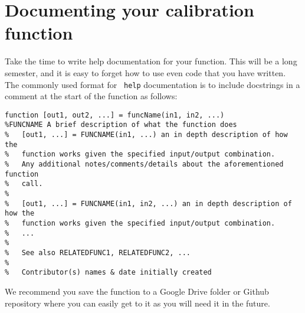 \documentclass{tufte-handout}
\begin{document}
\section{Documenting your calibration function}
Take the time to write help documentation for your function. This will be a long semester, and it is easy to forget how to use even code that you have written. The commonly used format for \Matlab\ \lstinline{help} documentation is to include docstrings in a comment at the start of the function as follows:
\begin{lstlisting}[style=usnaMatlab]
function [out1, out2, ...] = funcName(in1, in2, ...)
%FUNCNAME A brief description of what the function does
%	[out1, ...] = FUNCNAME(in1, ...) an in depth description of how the 
%	function works given the specified input/output combination.
%	Any additional notes/comments/details about the aforementioned function 
%	call.
%
%	[out1, ...] = FUNCNAME(in1, in2, ...) an in depth description of how the 
%	function works given the specified input/output combination.
%	...
%
% 	See also RELATEDFUNC1, RELATEDFUNC2, ...
%
%	Contributor(s) names & date initially created
\end{lstlisting}

We recommend you save the function to a Google Drive folder or Github repository where you can easily get to it as you will need it in the future. 
\end{document}
